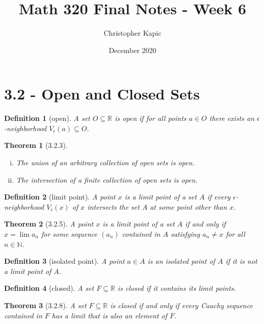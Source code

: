 \documentclass{article}
\title{Math 320 Final Notes - Week 6}
\author{Christopher Kapic}
\date{December 2020}
\newtheorem{definition}{Definition}
\newtheorem{theorem}{Theorem}
\begin{document}
\maketitle

\section*{3.2 - Open and Closed Sets}
\begin{definition}[open]
    A set $O \subseteq \mathbb{R}$ is \textit{open} if for all points $a \in O$ there exists an $\epsilon$-neighborhood $V_\epsilon (a) \subseteq O$.
\end{definition}

\begin{theorem}[3.2.3]
    \begin{enumerate}[(i)]
        \item The union of an arbitrary collection of open sets is open.
        \item The intersection of a finite collection of open sets is open.
    \end{enumerate}
\end{theorem}

\begin{definition}[limit point]
    A point $x$ is a \textit{limit point} of a set $A$ if every $\epsilon$-neighborhood $V_\epsilon (x)$ of $x$ intersects the set $A$ at some point other than $x$.
\end{definition}

\begin{theorem}[3.2.5]
    A point $x$ is a limit point of a set $A$ if and only if $x = \lim a_n$ for some sequence $(a_n)$ contained in $A$ satisfying $a_n \neq x$ for all $n \in \mathbb{N}$.
\end{theorem}

\begin{definition}[isolated point]
    A point $a \in A$ is an \textit{isolated point} of $A$ if it is not a limit point of $A$.
\end{definition}

\begin{definition}[closed]
    A set $F \subseteq \mathbb{R}$ is \textit{closed} if it contains its limit points.
\end{definition}

\begin{theorem}[3.2.8]
    A set $F \subseteq \mathbb{R}$ is closed if and only if every Cauchy sequence contained in $F$ has a limit that is also an element of $F$.
\end{theorem}
\end{document}
